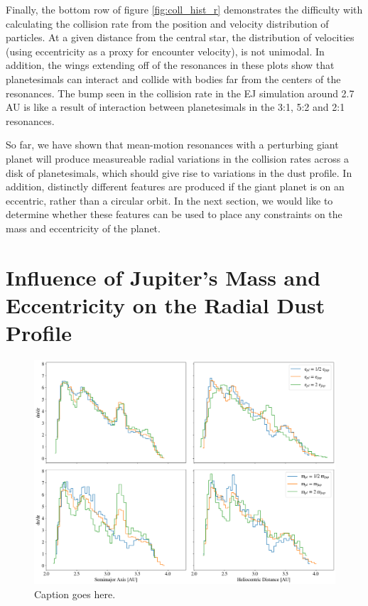 \documentclass[onecolumn]{aastex63}
\begin{document}
Finally, the bottom row of figure \ref{fig:coll_hist_r} demonstrates the difficulty with calculating the collision rate from the position and velocity 
distribution of particles. At a given distance from the central star, the distribution of velocities (using eccentricity as a proxy for encounter 
velocity), is not unimodal. In addition, the wings extending off of the resonances in these plots show that planetesimals can interact and collide 
with bodies far from the centers of the resonances. The bump seen in the collision rate in the EJ simulation around 2.7 AU is like a result of interaction between planetesimals in the 3:1, 5:2 and 2:1 resonances.

So far, we have shown that mean-motion resonances with a perturbing giant planet will produce measureable radial variations in the collision rates across a disk of planetesimals, which should give rise to variations in the dust profile. In addition, distinctly different features are produced if the giant planet is on an eccentric, rather than a circular orbit. In the next section, we would like to determine whether these features can be used to place any constraints on the mass and eccentricity of the planet.

\section{Influence of Jupiter's Mass and Eccentricity on the Radial Dust Profile}

\begin{figure}
    \includegraphics[width=\textwidth]{figures/coll_hist_e_and_m.png}
    \caption{Caption goes here.\label{fig:coll_hist_e_and_m}}
\end{figure}
\end{document}
